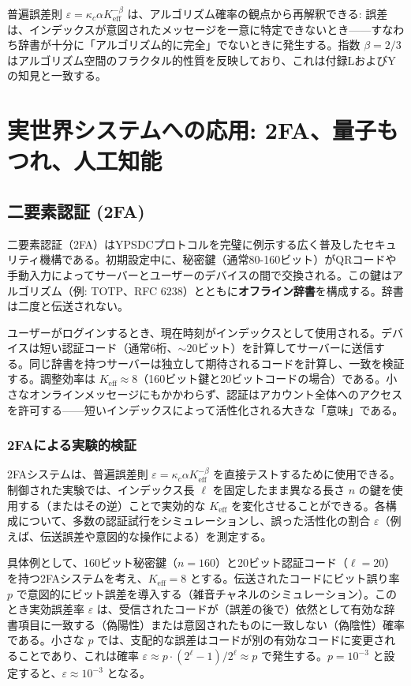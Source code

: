 \documentclass[12pt,a4paper]{article}
\theoremstyle{definition}
\theoremstyle{remark}
\newcommand{\Keff}{K_{\mathrm{eff}}}
\begin{document}
	普遍誤差則 $\varepsilon = \kappa_c \alpha K_{\mathrm{eff}}^{-\beta}$ は、アルゴリズム確率の観点から再解釈できる: 誤差は、インデックスが意図されたメッセージを一意に特定できないとき——すなわち辞書が十分に「アルゴリズム的に完全」でないときに発生する。指数 $\beta = 2/3$ はアルゴリズム空間のフラクタル的性質を反映しており、これは付録LおよびYの知見と一致する。
	
	\section{実世界システムへの応用: 2FA、量子もつれ、人工知能}
	\label{sec:applications}
	
	\subsection{二要素認証 (2FA)}
	
	二要素認証（2FA）はYPSDCプロトコルを完璧に例示する広く普及したセキュリティ機構である。初期設定中に、秘密鍵（通常80-160ビット）がQRコードや手動入力によってサーバーとユーザーのデバイスの間で交換される。この鍵はアルゴリズム（例: TOTP、RFC 6238）とともに\textbf{オフライン辞書}を構成する。辞書は二度と伝送されない。
	
	ユーザーがログインするとき、現在時刻がインデックスとして使用される。デバイスは短い認証コード（通常6桁、$\sim 20$ビット）を計算してサーバーに送信する。同じ辞書を持つサーバーは独立して期待されるコードを計算し、一致を検証する。調整効率は $\Keff \approx 8$（160ビット鍵と20ビットコードの場合）である。小さなオンラインメッセージにもかかわらず、認証はアカウント全体へのアクセスを許可する——短いインデックスによって活性化される大きな「意味」である。
	
	\subsubsection{2FAによる実験的検証}
	\label{subsec:2fa-experiment}
	
	2FAシステムは、普遍誤差則 $\varepsilon = \kappa_c \alpha K_{\mathrm{eff}}^{-\beta}$ を直接テストするために使用できる。制御された実験では、インデックス長 $\ell$ を固定したまま異なる長さ $n$ の鍵を使用する（またはその逆）ことで実効的な $\Keff$ を変化させることができる。各構成について、多数の認証試行をシミュレーションし、誤った活性化の割合 $\varepsilon$（例えば、伝送誤差や意図的な操作による）を測定する。
	
	具体例として、160ビット秘密鍵（$n=160$）と20ビット認証コード（$\ell=20$）を持つ2FAシステムを考え、$\Keff = 8$ とする。伝送されたコードにビット誤り率 $p$ で意図的にビット誤差を導入する（雑音チャネルのシミュレーション）。このとき実効誤差率 $\varepsilon$ は、受信されたコードが（誤差の後で）依然として有効な辞書項目に一致する（偽陽性）または意図されたものに一致しない（偽陰性）確率である。小さな $p$ では、支配的な誤差はコードが別の有効なコードに変更されることであり、これは確率 $\varepsilon \approx p \cdot (2^\ell -1)/2^\ell \approx p$ で発生する。$p = 10^{-3}$ と設定すると、$\varepsilon \approx 10^{-3}$ となる。
	
\end{document}
